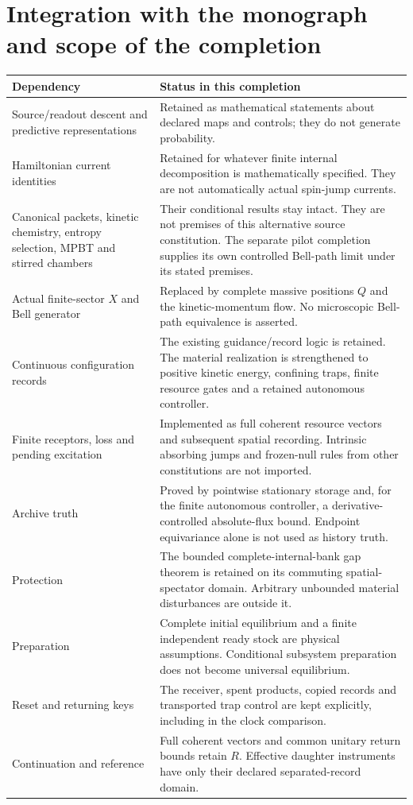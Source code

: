 \documentclass[11pt]{article}
\theoremstyle{definition}\newtheorem{assumption}[theorem]{Constitutive assumption}
\theoremstyle{remark}\newtheorem{remark}[theorem]{Remark}
\begin{document}
\section{Integration with the monograph and scope of the completion}
\label{sec:integration}
\begin{longtable}{@{}>{\raggedright\arraybackslash}p{}>{\raggedright\arraybackslash}p{}@{}}\toprule
Dependency & Status in this completion\\\midrule\endhead
Source/readout descent and predictive representations & Retained as mathematical statements about declared maps and controls; they do not generate probability.\\
Hamiltonian current identities & Retained for whatever finite internal decomposition is mathematically specified. They are not automatically actual spin-jump currents.\\
Canonical packets, kinetic chemistry, entropy selection, MPBT and stirred chambers & Their conditional results stay intact. They are not premises of this alternative source constitution. The separate pilot completion supplies its own controlled Bell-path limit under its stated premises.\\
Actual finite-sector $X$ and Bell generator & Replaced by complete massive positions $Q$ and the kinetic-momentum flow. No microscopic Bell-path equivalence is asserted.\\
Continuous configuration records & The existing guidance/record logic is retained. The material realization is strengthened to positive kinetic energy, confining traps, finite resource gates and a retained autonomous controller.\\
Finite receptors, loss and pending excitation & Implemented as full coherent resource vectors and subsequent spatial recording. Intrinsic absorbing jumps and frozen-null rules from other constitutions are not imported.\\
Archive truth & Proved by pointwise stationary storage and, for the finite autonomous controller, a derivative-controlled absolute-flux bound. Endpoint equivariance alone is not used as history truth.\\
Protection & The bounded complete-internal-bank gap theorem is retained on its commuting spatial-spectator domain. Arbitrary unbounded material disturbances are outside it.\\
Preparation & Complete initial equilibrium and a finite independent ready stock are physical assumptions. Conditional subsystem preparation does not become universal equilibrium.\\
Reset and returning keys & The receiver, spent products, copied records and transported trap control are kept explicitly, including in the clock comparison.\\
Continuation and reference & Full coherent vectors and common unitary return bounds retain $R$. Effective daughter instruments have only their declared separated-record domain.\\\bottomrule
\end{longtable}
\end{document}
